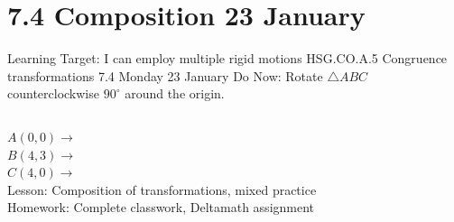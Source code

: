 \documentclass[onlytextwidth, aspectratio=169]{beamer}
\begin{document}
\section{7.4 Composition \hfill 23 January \,}
\begin{frame}{Learning Target: I can employ multiple rigid motions}
  {HSG.CO.A.5 Congruence transformations \hfill \alert{7.4 Monday 23 January}}
  Do Now: Rotate $\triangle ABC$ counterclockwise $90^\circ$ around the origin.  \vspace{0.5cm}
  \begin{columns}
    $A(0,0) \rightarrow$ \\[0.3cm]
    $B(4,3) \rightarrow$ \\[0.3cm]
    $C(4,0) \rightarrow$ \\[0.3cm]
    Lesson: Composition of transformations, mixed practice \\[0.5cm]
    Homework: Complete classwork, Deltamath assignment
    \begin{flushright}
    \end{flushright}
  \end{columns}
\end{frame}
\end{document}
